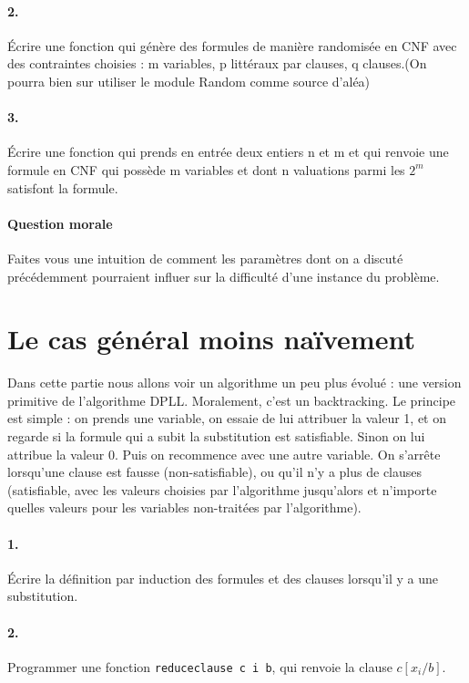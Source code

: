 \documentclass[10pt,a4paper]{article}
\begin{document}
\paragraph{2.} Écrire une fonction qui génère des formules de manière randomisée en CNF avec des contraintes choisies : m variables, p littéraux par clauses, q clauses.(On pourra bien sur utiliser le module Random comme source d'aléa)

\paragraph{3.} Écrire une fonction qui prends en entrée deux entiers n et m et qui renvoie une formule en CNF qui possède m variables et dont n valuations parmi les $2^m$ satisfont la formule.
 
\paragraph{Question morale} Faites vous une intuition de comment les paramètres dont on a discuté précédemment pourraient influer sur la difficulté d'une instance du problème.


\section{Le cas général moins naïvement}
Dans cette partie nous allons voir un algorithme un peu plus évolué : une version primitive de l'algorithme DPLL. Moralement, c'est un backtracking. Le principe est simple : on prends une variable, on essaie de lui attribuer la valeur 1, et on regarde si la formule qui a subit la substitution est satisfiable. Sinon on lui attribue la valeur 0. Puis on recommence avec une autre variable. On s'arrête lorsqu'une clause est fausse (non-satisfiable), ou qu'il n'y a plus de clauses (satisfiable, avec les valeurs choisies par l'algorithme jusqu'alors et n'importe quelles valeurs pour les variables non-traitées par l'algorithme).

\paragraph{1.} Écrire la définition par induction des formules et des clauses lorsqu'il y a une substitution.

\paragraph{2.} Programmer une fonction \texttt{reduceclause c i b}, qui renvoie la clause $c[x_i/b]$.
\end{document}
